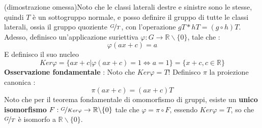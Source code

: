 \documentclass[12pt, letterpaper]{article}
\newcommand{\R}{{\mathbb R}}
\begin{document}
(\color{red}dimostrazione omessa\color{black})Noto che le classi laterali destre e sinistre sono le stesse, quindi 
\(T\) è un sottogruppo normale, e posso definire il gruppo di tutte le classi laterali, ossia il gruppo 
quoziente \(\nicefrac{G}{T}\), con l'operazione \(gT*hT=(g\circ h)T\).
\\Adesso, definisco un'applicazione suriettiva \(\varphi : G\rightarrow \R\backslash\{0\}\), tale che : \begin{equation}
    \varphi(ax+c)=a
\end{equation}
E definisco il suo nucleo \begin{equation}
    Ker\varphi = \{ax+c|\varphi(ax+c)=1\iff a=1\}=\{x+c, c\in \R\}
\end{equation}
\textbf{Osservazione fondamentale} : Noto che \(Ker\varphi = T\)! Definisco \(\pi\) la proiezione canonica :\begin{equation}
    \pi(ax+c)=(ax+c)T
\end{equation} 
Noto che per il teorema fondamentale di omomorfismo di gruppi, esiste un \textbf{unico isomorfismo} \(F:\nicefrac{G}{Ker\varphi}\rightarrow \R\backslash\{0\}\) 
tale che \(\varphi=\pi\circ F\), essendo  \(Ker\varphi = T\), so che \(\nicefrac{G}{T}\) è isomorfo a \(\R\backslash\{0\}\).
\end{document}
